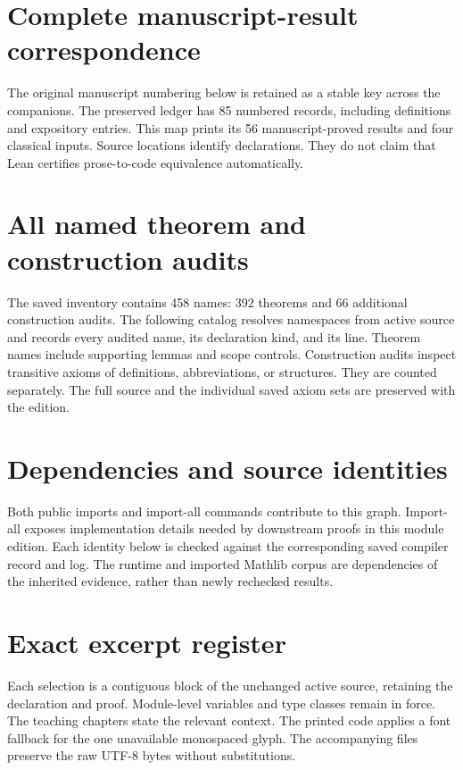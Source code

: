 \clearpage
\setcounter{tocdepth}{1}
\begingroup\small
\tableofcontents
\endgroup
\clearpage
{}

\clearpage
\clearpage
\clearpage
\clearpage
\clearpage
\clearpage
\clearpage
\clearpage
\clearpage
\clearpage
\clearpage\section{Complete manuscript-result correspondence}\label{sec:scope}
The original manuscript numbering below is retained as a stable key across the companions. The preserved ledger has 85 numbered records, including definitions and expository entries. This map prints its 56 manuscript-proved results and four classical inputs. Source locations identify declarations. They do not claim that Lean certifies prose-to-code equivalence automatically.
\begingroup\sloppy\endgroup
\clearpage\section{All named theorem and construction audits}\label{sec:catalog}
The saved inventory contains 458 names: 392 theorems and 66 additional construction audits. The following catalog resolves namespaces from active source and records every audited name, its declaration kind, and its line. Theorem names include supporting lemmas and scope controls. Construction audits inspect transitive axioms of definitions, abbreviations, or structures. They are counted separately. The full source and the individual saved axiom sets are preserved with the edition.

\clearpage\section{Dependencies and source identities}\label{sec:dependencies}
Both public imports and import-all commands contribute to this graph. Import-all exposes implementation details needed by downstream proofs in this module edition. Each identity below is checked against the corresponding saved compiler record and log. The runtime and imported Mathlib corpus are dependencies of the inherited evidence, rather than newly rechecked results.

\clearpage\section{Exact excerpt register}\label{sec:excerpts}
Each selection is a contiguous block of the unchanged active source, retaining the declaration and proof. Module-level variables and type classes remain in force. The teaching chapters state the relevant context. The printed code applies a font fallback for the one unavailable monospaced glyph. The accompanying  files preserve the raw UTF-8 bytes without substitutions.

\clearpage


